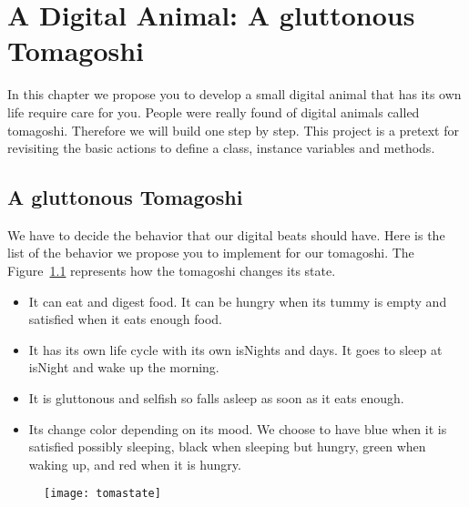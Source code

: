 \ifx\wholebook\relax\else



\fi


\chapter{A Digital Animal: A gluttonous Tomagoshi}\label{cha:toma}


In this chapter we propose you to develop a small digital animal that has its own life require care for you. 
People were really found of digital animals called tomagoshi. Therefore  we will build one step by step. 
This project is a pretext for revisiting the basic actions to define a class, instance variables and methods. 

\section{A gluttonous Tomagoshi }

We have to decide the behavior that our digital beats should have. 
Here is the list of the behavior we propose you to implement for our  tomagoshi. The Figure~\ref{fig:tomastate} represents how the tomagoshi changes its state. 
\begin{itemize}
\item It can eat and digest food. It can be hungry when its tummy is empty and satisfied when it eats enough food.
\item It has its own life cycle with its own isNights and days. It goes to sleep at isNight and wake up the morning. 
\item It is gluttonous and selfish so falls asleep as soon as it eats enough. 
\item Its change color depending on its mood.  
We choose to have blue when it is  satisfied possibly sleeping, black when sleeping but hungry, green when waking up, and red when it is hungry. 
\end{itemize}

\begin{figure}
\begin{center}
\texttt{[image: tomastate]}
\caption{\label{fig:tomastate}}
\end{center}
\end{figure}

